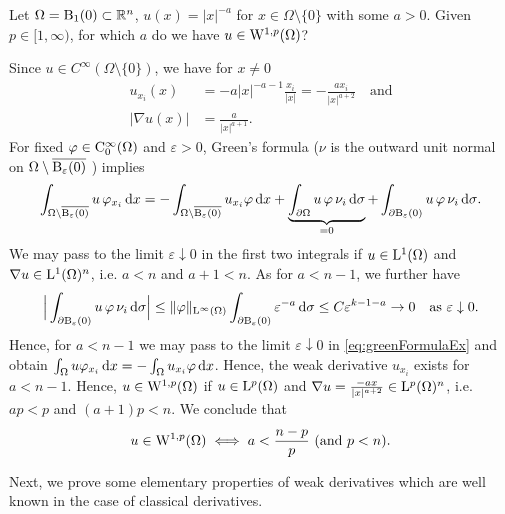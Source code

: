 \begin{ex}
  Let $\Omega = \mathrm{B}_1(0) \subset \mathbb{R}^n$, $u(x) = |x|^{-a}$ for $x \in \Omega \setminus \{0\}$ with some $a > 0$.
  Given $p \in [1,\infty)$, for which $a$ do we have $u \in \mathrm{W}^{1,p}(\Omega)$?

    Since $u \in C^\infty(\Omega \setminus \{0\})$, we have for $x \neq 0$
    \begin{align*}
      u_{x_i}(x) &= -a|x|^{-a-1} \frac{x_i}{|x|} = -\frac{ax_i}{|x|^{a + 2}} \quad \text{and} \\
      |\nabla u(x)| &= \frac{a}{|x|^{a + 1}}.
    \end{align*}
    For fixed $\varphi \in \mathrm{C}_0^\infty(\Omega)$ and $\varepsilon > 0$, Green's formula ($\nu$ is the outward unit normal on $\Omega \setminus \overline{\mathrm{B}_\varepsilon(0)}$ ) implies
    \begin{equation}
      \label{eq:greenFormulaEx}
      \int_{\Omega \setminus \overline{\mathrm{B}_\varepsilon(0)}} u \, \varphi_{x_i} \, {\operatorname{d}\!{x}}
      = -\int_{\Omega \setminus \overline{\mathrm{B}_\varepsilon(0)}} u_{x_i} \varphi \, {\operatorname{d}\!{x}} + \underbrace{\int_{\partial \Omega} u \, \varphi \, \nu_i \, {\operatorname{d}\!{\sigma}}}_{= 0}
      + \int_{\partial \mathrm{B}_\varepsilon(0)} u \, \varphi \, \nu_i \, {\operatorname{d}\!{\sigma}}.
    \end{equation}
    We may pass to the limit $\varepsilon \downarrow 0$ in the first two integrals if $u \in \mathrm{L}^1(\Omega)$ and $\nabla u \in \mathrm{L}^1(\Omega)^n$, i.e. $a < n$ and $a + 1 < n$.
    As for $a < n - 1$, we further have
    $$
    \Big| \int_{\partial \mathrm{B}_\varepsilon(0)} u \, \varphi \,  \nu_i \, {\operatorname{d}\!{\sigma}} \Big|
      \leq \|\varphi\|_{\mathrm{L}^\infty(\Omega)} \int_{\partial \mathrm{B}_\varepsilon(0)} \varepsilon^{-a} \, {\operatorname{d}\!{\sigma}}
      \leq C \varepsilon^{k - 1 - a} \to 0 \quad\text{as } \varepsilon \downarrow 0.
    $$
    Hence, for $a < n - 1$ we may pass to the limit $\varepsilon \downarrow 0$ in \eqref{eq:greenFormulaEx} and obtain $\int_\Omega u\varphi_{x_i} \, {\operatorname{d}\!{x}} = - \int_\Omega u_{x_i} \varphi \, {\operatorname{d}\!{x}}$.
    Hence, the weak derivative $u_{x_i}$ exists for $a < n - 1$.
    Hence, $u \in \mathrm{W}^{1,p}(\Omega)$ if $u \in \mathrm{L}^p(\Omega)$ and $\nabla u = \frac{-a x}{|x|^{a + 2}} \in \mathrm{L}^p(\Omega)^n$, i.e. $ap < p$ and $(a + 1)p < n$.
    We conclude that
    $$
    u \in \mathrm{W}^{1,p}(\Omega) \iff a < \frac{n - p}{p} \text{ (and $p < n$)}.
    $$
\end{ex}

Next, we prove some elementary properties of weak derivatives which are well known in the case of classical derivatives.

